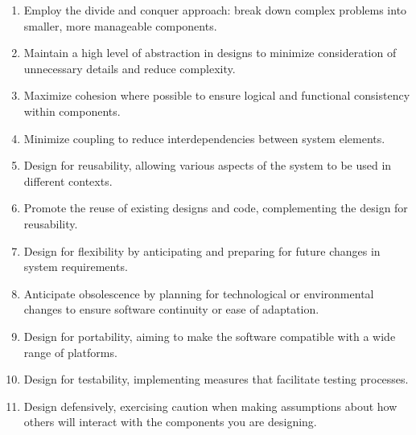 \begin{enumerate}
    \item Employ the divide and conquer approach: break down complex problems into smaller, more manageable components.
    \item Maintain a high level of abstraction in designs to minimize consideration of unnecessary details and reduce complexity.
    \item Maximize cohesion where possible to ensure logical and functional consistency within components.
    \item Minimize coupling to reduce interdependencies between system elements.
    \item Design for reusability, allowing various aspects of the system to be used in different contexts.
    \item Promote the reuse of existing designs and code, complementing the design for reusability.
    \item Design for flexibility by anticipating and preparing for future changes in system requirements.
    \item Anticipate obsolescence by planning for technological or environmental changes to ensure software continuity or ease of adaptation.
    \item Design for portability, aiming to make the software compatible with a wide range of platforms.
    \item Design for testability, implementing measures that facilitate testing processes.
    \item Design defensively, exercising caution when making assumptions about how others will interact with the components you are designing.
\end{enumerate}